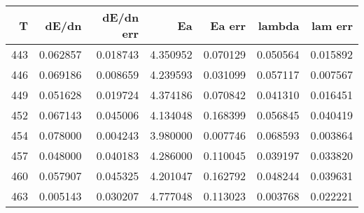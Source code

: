 \begin{tabular}{rrrrrrr}
\toprule
  T &    dE/dn &  dE/dn err &       Ea &   Ea err &   lambda &  lam err \\
\midrule
443 & 0.062857 &   0.018743 & 4.350952 & 0.070129 & 0.050564 & 0.015892 \\
446 & 0.069186 &   0.008659 & 4.239593 & 0.031099 & 0.057117 & 0.007567 \\
449 & 0.051628 &   0.019724 & 4.374186 & 0.070842 & 0.041310 & 0.016451 \\
452 & 0.067143 &   0.045006 & 4.134048 & 0.168399 & 0.056845 & 0.040419 \\
454 & 0.078000 &   0.004243 & 3.980000 & 0.007746 & 0.068593 & 0.003864 \\
457 & 0.048000 &   0.040183 & 4.286000 & 0.110045 & 0.039197 & 0.033820 \\
460 & 0.057907 &   0.045325 & 4.201047 & 0.162792 & 0.048244 & 0.039631 \\
463 & 0.005143 &   0.030207 & 4.777048 & 0.113023 & 0.003768 & 0.022221 \\
\bottomrule
\end{tabular}
